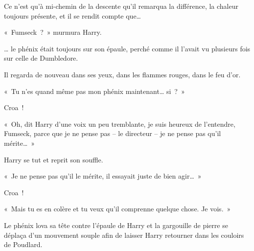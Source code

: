 Ce n'est qu'à mi-chemin de la descente qu'il remarqua la différence, la chaleur toujours présente, et il se rendit compte que…

«~Fumseck~?~» murmura Harry.

… le phénix était toujours sur son épaule, perché comme il l'avait vu plusieurs fois sur celle de Dumbledore.

Il regarda de nouveau dans ses yeux, dans les flammes rouges, dans le feu d'or.

«~Tu n'es quand même pas mon phénix maintenant… si~?~»

Croa~!

«~Oh, dit Harry d'une voix un peu tremblante, je suis heureux de l'entendre, Fumseck, parce que je ne pense pas -- le directeur -- je ne pense pas qu'il mérite…~»

Harry se tut et reprit son souffle.

«~Je ne pense pas qu'il le mérite, il essayait juste de bien agir…~»

Croa~!

«~Mais tu es en colère et tu veux qu'il comprenne quelque chose. Je vois.~»

Le phénix lova sa tête contre l'épaule de Harry et la gargouille de pierre se déplaça d'un mouvement souple afin de laisser Harry retourner dans les couloirs de Poudlard.
